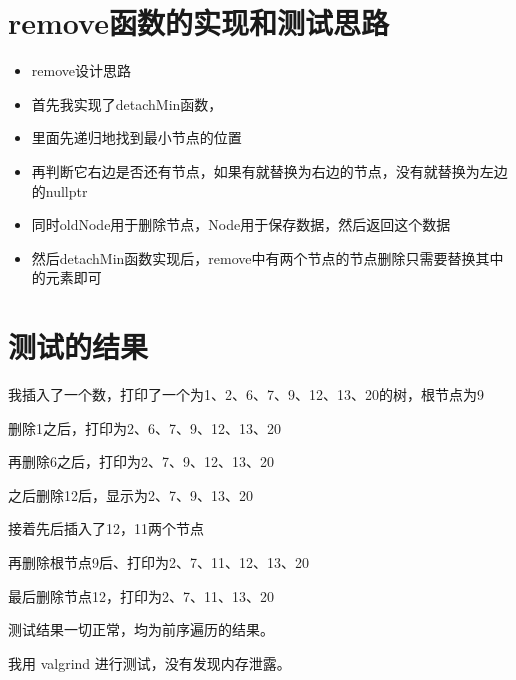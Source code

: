 \documentclass[UTF8]{ctexart}
\begin{document}
\pagestyle{fancy}
\fancyhead{}

\section{remove函数的实现和测试思路}

\begin{itemize}
\item remove设计思路
\item 首先我实现了detachMin函数，
\item 里面先递归地找到最小节点的位置
\item 再判断它右边是否还有节点，如果有就替换为右边的节点，没有就替换为左边的nullptr
\item 同时oldNode用于删除节点，Node用于保存数据，然后返回这个数据
\item 然后detachMin函数实现后，remove中有两个节点的节点删除只需要替换其中的元素即可

\end{itemize}

\section{测试的结果}
我插入了一个数，打印了一个为1、2、6、7、9、12、13、20的树，根节点为9

删除1之后，打印为2、6、7、9、12、13、20

再删除6之后，打印为2、7、9、12、13、20

之后删除12后，显示为2、7、9、13、20

接着先后插入了12，11两个节点

再删除根节点9后、打印为2、7、11、12、13、20

最后删除节点12，打印为2、7、11、13、20

测试结果一切正常，均为前序遍历的结果。

我用 valgrind 进行测试，没有发现内存泄露。
\end{document}
